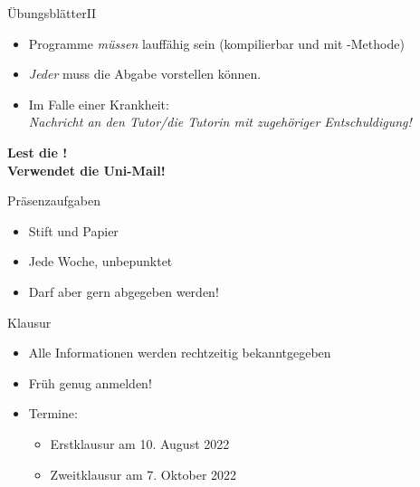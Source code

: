 \begin{frame}[t]{Übungsblätter\hfill II}
    \begin{itemize}[<+(1)->]
        \itemsep12pt
        \item Programme \emph{müssen} lauffähig sein (kompilierbar und mit -Methode)\pause
        \item \emph{Jeder} muss die Abgabe vorstellen können.\pause{}
        \item Im Falle einer Krankheit:\pause\\\emph{Nachricht an den Tutor/die Tutorin mit zugehöriger Entschuldigung!}
    \end{itemize}
    \vfill
    \begin{center}
        \pause\bfseries Lest die !\\
        \pause\bfseries Verwendet die Uni-Mail!
    \end{center}
\end{frame}

\iffull
\begin{frame}[t]{Präsenzaufgaben}
    \begin{itemize}[<+(1)->]
        \itemsep10pt
        \item Stift und Papier
        \item Jede Woche, unbepunktet
        \item Darf aber gern abgegeben werden!
    \end{itemize}
\end{frame}
\fi

\begin{frame}{Klausur}
    \begin{itemize}
        \itemsep16pt
        \item Alle Informationen werden rechtzeitig bekanntgegeben
        \item Früh genug anmelden!
        \item Termine: \begin{itemize}
            \item Erstklausur am 10. August 2022
            \item Zweitklausur am 7. Oktober 2022
        \end{itemize}
    \end{itemize}
\end{frame}

